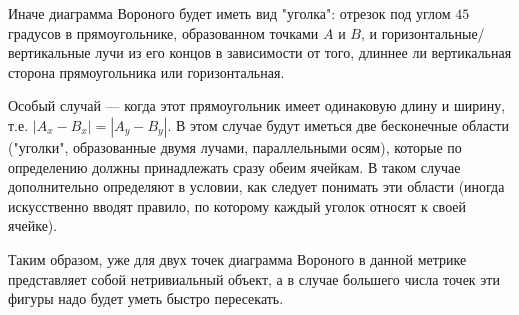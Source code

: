 Иначе диаграмма Вороного будет иметь вид "уголка": отрезок под углом $45$ градусов в прямоугольнике, образованном точками $A$ и $B$, и горизонтальные/вертикальные лучи из его концов в зависимости от того, длиннее ли вертикальная сторона прямоугольника или горизонтальная.

Особый случай --- когда этот прямоугольник имеет одинаковую длину и ширину, т.е. $|A_x-B_x| = |A_y-B_y|$. В этом случае будут иметься две бесконечные области ("уголки", образованные двумя лучами, параллельными осям), которые по определению должны принадлежать сразу обеим ячейкам. В таком случае дополнительно определяют в условии, как следует понимать эти области (иногда искусственно вводят правило, по которому каждый уголок относят к своей ячейке).

Таким образом, уже для двух точек диаграмма Вороного в данной метрике представляет собой нетривиальный объект, а в случае большего числа точек эти фигуры надо будет уметь быстро пересекать.
